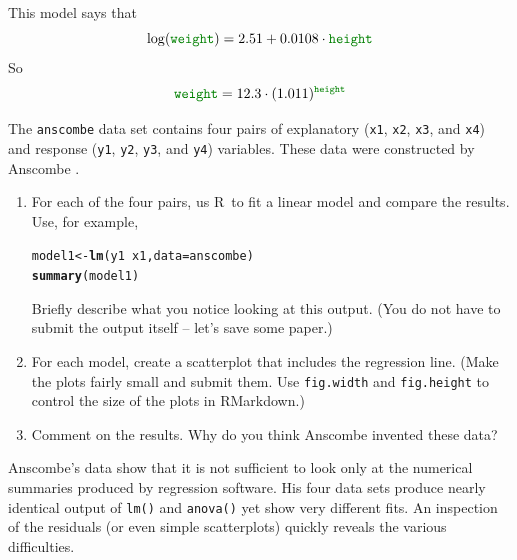 \documentclass[twoside]{book}
\makeatletter
\newcommand{\hlopt}[1]{\textcolor[rgb]{0,0,0}{#1}}%
\newcommand{\hlstd}[1]{\textcolor[rgb]{0.345,0.345,0.345}{#1}}%
\newcommand{\hlkwb}[1]{\textcolor[rgb]{0.69,0.353,0.396}{#1}}%
\newcommand{\hlkwc}[1]{\textcolor[rgb]{0.333,0.667,0.333}{#1}}%
\newcommand{\hlkwd}[1]{\textcolor[rgb]{0.737,0.353,0.396}{\textbf{#1}}}%
\newenvironment{kframe}{%
 \def\at@end@of@kframe{}%
 \ifinner\ifhmode%
  \def\at@end@of@kframe{\end{minipage}}%
  \begin{minipage}{\columnwidth}%
 \fi\fi%
 \def\FrameCommand##1{\hskip\@totalleftmargin \hskip-\fboxsep
 \colorbox{shadecolor}{##1}\hskip-\fboxsep
     \hskip-\linewidth \hskip-\@totalleftmargin \hskip\columnwidth}%
 \MakeFramed {\advance\hsize-\width
   \@totalleftmargin\z@ \linewidth\hsize
   \@setminipage}}%
 {\par\unskip\endMakeFramed%
 \at@end@of@kframe}
\newenvironment{knitrout}{}{} %
\newcommand{\variable}[1]{{\color{green!50!black}\texttt{#1}}}
\newcommand{\Rindex}[1]{\index{\texttt{#1}}}
\newcommand{\dataframe}[1]{{\color{blue!80!black}\texttt{#1}}\Rindex{#1}}
\def\R{{\sf R}}
\newcounter{example}[section]
\makeatother
\begin{document}
\begin{solution}
\begin{enumerate}
\begin{knitrout}
{}



\end{knitrout}
This model says that
\[
\log( \variable{weight} ) 
	= 2.51 + 0.0108 \cdot \variable{height}
\]
So
\[
\variable{weight}  
= 12.3 
		\cdot (1.011)^{\variable{height}}
\]
\end{enumerate}
\end{solution}

\begin{problem}
	The \dataframe{anscombe} data set contains four pairs of explanatory 
	(\variable{x1}, \variable{x2}, \variable{x3}, and \variable{x4})
	and response
	(\variable{y1}, \variable{y2}, \variable{y3}, and \variable{y4})
	variables.  These data were constructed by Anscombe 
	\cite{Anscombe:1973:Graphs}.
	\begin{enumerate}
		\item 
			For each of the four pairs, us \R\ to fit a linear model and 
			compare the results.  Use, for example,
\begin{knitrout}
\color{fgcolor}\begin{kframe}
\begin{alltt}
\hlstd{model1} \hlkwb{<-} \hlkwd{lm}\hlstd{(y1} \hlopt{~} \hlstd{x1,} \hlkwc{data} \hlstd{= anscombe)}
\hlkwd{summary}\hlstd{(model1)}
\end{alltt}
\end{kframe}
\end{knitrout}
			Briefly describe what you notice looking at this output.  (You do not have
			to submit the output itself -- let's save some paper.)
		\item
			For each model, create a scatterplot that includes the regression line.
			(Make the plots fairly small and submit them.
			Use \texttt{fig.width} and \texttt{fig.height} to control the size of 
			the plots in RMarkdown.)
		\item
			Comment on the results.  Why do you think Anscombe invented these data?
	\end{enumerate}
\end{problem}

\begin{solution}
  Anscombe's data show that it is not sufficient to look only at the 
  numerical summaries produced by regression software.  His four data
  sets produce nearly identical output of \verb!lm()! and \verb!anova()!
  yet show very different fits.  An inspection of the residuals (or even
  simple scatterplots) quickly reveals the various difficulties.
\end{solution}
\end{document}
